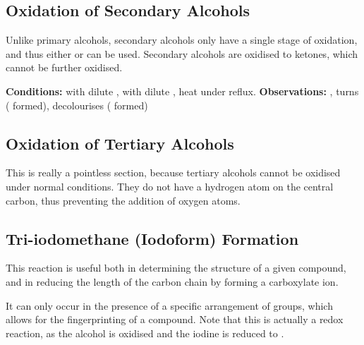 

		\pagebreak
		\subsection{Oxidation of Secondary Alcohols}

			Unlike primary alcohols, secondary alcohols only have a single stage of oxidation, and thus either  or  can be
			used. Secondary alcohols are oxidised to ketones, which cannot be further oxidised.

			\vspace{1.5em}
			\vbox{\textbf{Conditions:}	\tabto{35mm} with dilute ,   with dilute ,
										\tabto{35mm}heat under reflux.}
			\vspace{0.75em}
			\vbox{\textbf{Observations:}\tabto{35mm} , turns 
													( formed), 
										\tabto{35mm}  decolourises ( formed)}



		\subsection{Oxidation of Tertiary Alcohols}

			This is really a pointless section, because tertiary alcohols cannot be oxidised under normal conditions. They do not have a hydrogen
			atom on the central carbon, thus preventing the addition of oxygen atoms.


		\pagebreak
		\subsection{Tri-iodomethane (Iodoform) Formation}

			This reaction is useful both in determining the structure of a given compound, and in reducing the length of the carbon chain by
			forming a carboxylate ion.

			It can only occur in the presence of a specific arrangement of groups, which allows for the fingerprinting of a compound. Note that
			this is actually a redox reaction, as the alcohol is oxidised and the iodine is reduced to .


